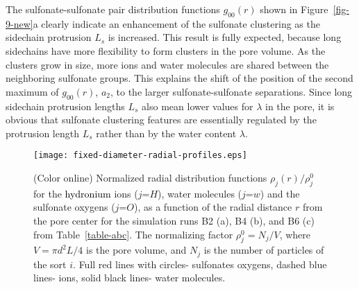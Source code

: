 \documentclass[3p,english,preprint]{elsarticle}
\newcommand{\need}[1]{\textcolor{black}{#1}}
\newcommand{\mage}[1]{\textcolor{black}{#1}}
\begin{document}
The sulfonate-sulfonate pair distribution functions $g_{00}(r)$
 shown in Figure~\ref{fig-9-new}a 
clearly  indicate an enhancement of the  sulfonate clustering 
 as  the sidechain  protrusion $L_s$ is increased. 
 This result is fully expected, because long sidechains have 
more flexibility to form clusters in the pore volume. As the clusters grow in size, 
 more ions and water molecules are  shared between 
the neighboring sulfonate groups. This explains     
the shift of the position of the second maximum of $g_{00}(r)$, $a_2$, to the larger 
sulfonate-sulfonate separations. 
Since long sidechain  protrusion 
lengths $L_s$ also mean lower values for $\lambda$ in the pore, 
it is obvious that  sulfonate 
clustering features are essentially regulated by the protrusion length $L_s$ 
rather than by the water content $\lambda$.  

\begin{figure}[!ht]
\begin{center}
\texttt{[image: fixed-diameter-radial-profiles.eps]}
\end{center}
\vspace{-0.7cm}
\caption{(Color online)   
Normalized radial distribution
  functions $\rho_j(r)/\rho_j^0$ for the 
{\need{ 
 hydronium 
}}
ions  ($j$=$H$), water molecules ($j$=$w$) and 
  the sulfonate oxygens ($j$=$O$), 
as a function of the radial distance $r$ from  the pore center
 for the simulation runs B2 (a), B4 (b), and B6 (c) from
   Table~\ref{table-abc}.   The normalizing
  factor $\rho_j^0=N_j/V$, where $V=\pi d^2 L/4$ is the pore volume,
  and $N_j$ is the  number of particles of the sort $i$. 
Full red lines with circles- sulfonates oxygens, dashed blue lines- ions, 
solid black lines- water molecules.
 \label{fig-10-new}}
\end{figure}
\end{document}
